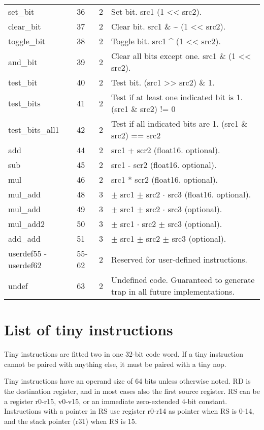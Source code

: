 \documentclass[forwardcom.tex]{subfiles}
\begin{document}
\begin{longtable} {|p{18mm}|p{9mm}|p{9mm}|p{76mm}|}
set\_bit     & 36 & 2 & Set bit. src1 \textbar{} (1 \textless\textless{} src2). \\
clear\_bit   & 37 & 2 & Clear bit. src1 \& \~{} (1 \textless\textless{} src2). \\
toggle\_bit  & 38 & 2 & Toggle bit. src1 \^{} (1 \textless\textless{} src2). \\
and\_bit     & 39 & 2 & Clear all bits except one. src1 \&{} (1 \textless\textless{} src2). \\
test\_bit    & 40 & 2 & Test bit. (src1 \textgreater\textgreater{} src2) \& 1. \\
test\_bits   & 41 & 2 & Test if at least one indicated bit is 1. (src1 \& src2) != 0 \\
test\_bits\_all1 & 42 & 2 & Test if all indicated bits are 1. (src1 \& src2) == src2 \\
add          & 44 & 2 & src1 + scr2 (float16. optional). \\
sub          & 45 & 2 & src1 - scr2 (float16. optional). \\
mul          & 46 & 2 & src1 * scr2 (float16. optional). \\
mul\_add     & 48 & 3 & $\pm$ src1 $\pm$ src2 $\cdot$ src3 (float16. optional). \\
mul\_add     & 49 & 3 & $\pm$ src1 $\pm$ src2 $\cdot$ src3 (optional). \\
mul\_add2    & 50 & 3 & $\pm$ src1 $\cdot$ src2 $\pm$ src3 (optional). \\
add\_add     & 51 & 3 & $\pm$ src1 $\pm$ src2 $\pm$ src3 (optional). \\
userdef55 - userdef62
             & 55-62 & 2 & Reserved for user-defined instructions. \\
undef        & 63 & 2 & Undefined code. Guaranteed to generate trap in all future implementations. \\
\hline
\end{longtable}


\section{List of tiny instructions}
Tiny instructions are fitted two in one 32-bit code word. If a tiny instruction cannot be paired with anything else, it must be paired with a tiny nop.
\vspace{2mm}

Tiny instructions have an operand size of 64 bits unless otherwise noted. RD is the destination register, and in most cases also the first source register. RS can be a register r0-r15, v0-v15, or an immediate zero-extended 4-bit constant. Instructions with a pointer in RS use register r0-r14 as pointer when RS is 0-14, and the stack pointer (r31) when RS is 15.
\vspace{2mm}
\end{document}

